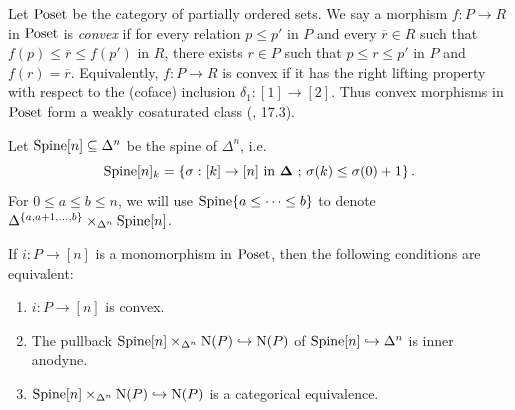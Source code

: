 \documentclass{tac}
\newcommand{\ol}[1]{\overline{#1}}
\newcommand{\tx}[1]{\textnormal{#1}}
\newcommand{\db}{\mathbf{\Delta}}
\begin{document}
\begin{definition} Let $\tx{Poset}$ be the category of partially ordered sets.  We say a morphism $f: P\to R$ in $\tx{Poset}$ is \emph{convex} if for every relation $p\leq p'$ in $P$ and every $\ol{r}\in R$ such that $f(p) \leq \ol{r} \leq f(p')$ in $R$, there exists $r\in P$ such that $p\leq r\leq p'$ in $P$ and $f(r) = \ol{r}$.  Equivalently, $f : P \to R$ is convex if it has the right lifting property with respect to the (coface) inclusion $\delta_1 : [1]\to [2]$.  Thus convex morphisms in $\tx{Poset}$ form a weakly cosaturated class (\cite{rezk}, 17.3).
\end{definition}
Let $\tx{Spine}[n] \subseteq \Delta^n$ be the spine of $\Delta^n$, i.e.
\[ \tx{Spine}[n]_k = \left\{ \sigma : [k]\to [n] \tx{ in }\db \tx{ ; }\sigma(k) \leq \sigma(0)+1  \right\}. \]
For $0\leq a \leq b \leq n$, we will use $\tx{Spine}\{ a\leq \dots \leq b \}$ to denote $\Delta^{\{ a, a+1 , \dots , b \}} \times_{\Delta^n} \tx{Spine}[n]$.
\begin{proposition}\label{convspineinnderan} If $i:P \to [n]$ is a monomorphism in $\tx{Poset}$, then the following conditions are equivalent: 
\begin{enumerate}
\item\label{convspineinnderan1} $i : P \to [n]$ is convex.
\item\label{convspineinnderan2} The pullback $\tx{Spine}[n] \times_{\Delta^n} \tx{N}(P) \hookrightarrow \tx{N}(P)$ of $\tx{Spine}[n] \hookrightarrow \Delta^n$ is inner anodyne.
\item\label{convspineinnderan3} $\tx{Spine}[n] \times_{\Delta^n} \tx{N}(P) \hookrightarrow \tx{N}(P)$ is a categorical equivalence.
\end{enumerate}
\end{proposition}
\end{document}
